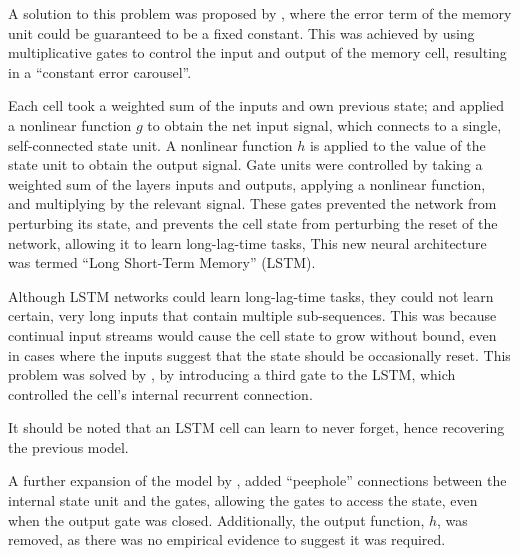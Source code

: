 A solution to this problem was proposed by \cite{Hochreiter:1997:Long}, where
the error term of the memory unit could be guaranteed to be a fixed constant.
This was achieved by using multiplicative gates to control the input and output
of the memory cell, resulting in a ``constant error carousel''.

Each cell took a weighted sum of the inputs and own previous state; and applied
a nonlinear function $g$ to obtain the net input signal, which connects to a
single, self-connected state unit.
A nonlinear function $h$ is applied to the value of the state unit to obtain
the output signal.
Gate units were controlled by taking a weighted sum of the layers inputs and
outputs, applying a nonlinear function, and multiplying by the relevant signal.
These gates prevented the network from perturbing its state, and prevents the
cell state from perturbing the reset of the network, allowing it to learn
long-lag-time tasks,
This new neural architecture was termed ``Long Short-Term Memory'' (LSTM).



Although LSTM networks could learn long-lag-time tasks, they could not learn
certain, very long inputs that contain multiple sub-sequences.
This was because continual input streams would cause the cell state to grow
without bound, even in cases where the inputs suggest that the state should be
occasionally reset.
This problem was solved by \cite{Gers:1999:Learning}, by introducing a third
gate to the LSTM, which controlled the cell's internal recurrent connection.

It should be noted that an LSTM cell can learn to never forget, hence recovering
the previous model.



A further expansion of the model by \cite{Gers:2000:Recurrent}, added
``peephole'' connections between the internal state unit and the gates, allowing
the gates to access the state, even when the output gate was closed.
Additionally, the output function, $h$, was removed, as there was no empirical
evidence to suggest it was required.

